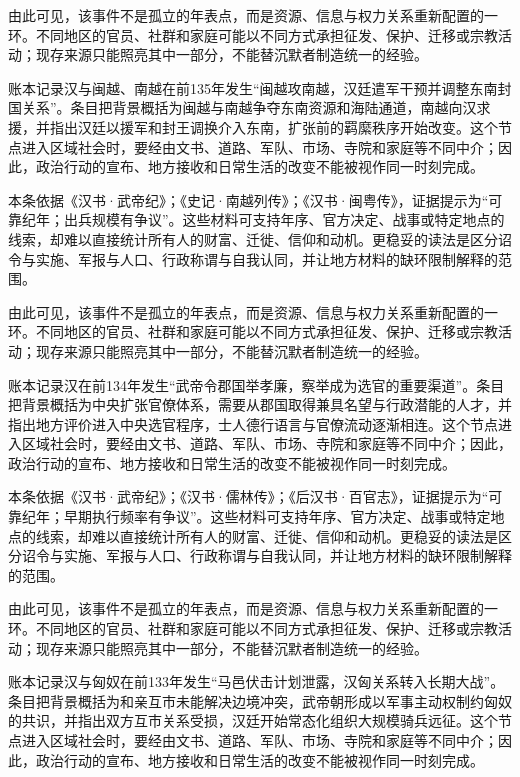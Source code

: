 由此可见，该事件不是孤立的年表点，而是资源、信息与权力关系重新配置的一环。不同地区的官员、社群和家庭可能以不同方式承担征发、保护、迁移或宗教活动；现存来源只能照亮其中一部分，不能替沉默者制造统一的经验。

账本记录汉与闽越、南越在前135年发生“闽越攻南越，汉廷遣军干预并调整东南封国关系”。条目把背景概括为闽越与南越争夺东南资源和海陆通道，南越向汉求援，并指出汉廷以援军和封王调换介入东南，扩张前的羁縻秩序开始改变。这个节点进入区域社会时，要经由文书、道路、军队、市场、寺院和家庭等不同中介；因此，政治行动的宣布、地方接收和日常生活的改变不能被视作同一时刻完成。

本条依据《汉书·武帝纪》；《史记·南越列传》；《汉书·闽粤传》，证据提示为“可靠纪年；出兵规模有争议”。这些材料可支持年序、官方决定、战事或特定地点的线索，却难以直接统计所有人的财富、迁徙、信仰和动机。更稳妥的读法是区分诏令与实施、军报与人口、行政称谓与自我认同，并让地方材料的缺环限制解释的范围。

由此可见，该事件不是孤立的年表点，而是资源、信息与权力关系重新配置的一环。不同地区的官员、社群和家庭可能以不同方式承担征发、保护、迁移或宗教活动；现存来源只能照亮其中一部分，不能替沉默者制造统一的经验。

账本记录汉在前134年发生“武帝令郡国举孝廉，察举成为选官的重要渠道”。条目把背景概括为中央扩张官僚体系，需要从郡国取得兼具名望与行政潜能的人才，并指出地方评价进入中央选官程序，士人德行语言与官僚流动逐渐相连。这个节点进入区域社会时，要经由文书、道路、军队、市场、寺院和家庭等不同中介；因此，政治行动的宣布、地方接收和日常生活的改变不能被视作同一时刻完成。

本条依据《汉书·武帝纪》；《汉书·儒林传》；《后汉书·百官志》，证据提示为“可靠纪年；早期执行频率有争议”。这些材料可支持年序、官方决定、战事或特定地点的线索，却难以直接统计所有人的财富、迁徙、信仰和动机。更稳妥的读法是区分诏令与实施、军报与人口、行政称谓与自我认同，并让地方材料的缺环限制解释的范围。

由此可见，该事件不是孤立的年表点，而是资源、信息与权力关系重新配置的一环。不同地区的官员、社群和家庭可能以不同方式承担征发、保护、迁移或宗教活动；现存来源只能照亮其中一部分，不能替沉默者制造统一的经验。

账本记录汉与匈奴在前133年发生“马邑伏击计划泄露，汉匈关系转入长期大战”。条目把背景概括为和亲互市未能解决边境冲突，武帝朝形成以军事主动权制约匈奴的共识，并指出双方互市关系受损，汉廷开始常态化组织大规模骑兵远征。这个节点进入区域社会时，要经由文书、道路、军队、市场、寺院和家庭等不同中介；因此，政治行动的宣布、地方接收和日常生活的改变不能被视作同一时刻完成。

